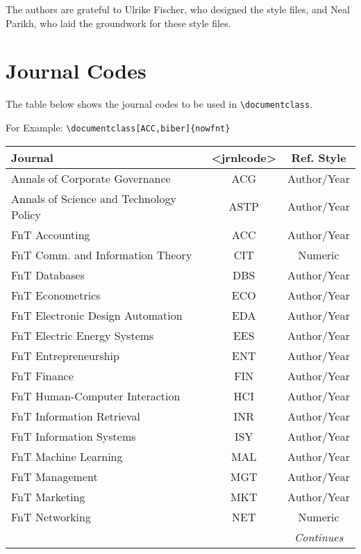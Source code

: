 \documentclass[examplefnt,biber]{nowfnt} %
\begin{document}



\begin{acknowledgements}
The authors are grateful to Ulrike Fischer, who designed the style files, and
Neal Parikh, who laid the groundwork for these style files.
\end{acknowledgements}

\appendix
\chapter{Journal Codes}\label{App:journalcodes}
\vspace*{-1.2in}
The table below shows the journal codes to be used in  \verb+\documentclass+.

\noindent For Example: \verb+\documentclass[ACC,biber]{nowfnt}+

\begin{table}[h]
\begin{tabular}{lcc}
{\textbf Journal} & {\textbf <jrnlcode> } & {\textbf Ref. Style }\\
\hline
\small
Annals of Corporate Governance & ACG & Author/Year \\
\small
Annals of Science and Technology Policy & ASTP & Author/Year \\
\small
FnT Accounting & ACC & Author/Year \\
\small
FnT Comm. and Information Theory & CIT & Numeric \\
\small
FnT Databases & DBS & Author/Year \\
\small
FnT Econometrics & ECO & Author/Year \\
\small
FnT Electronic Design Automation & EDA & Author/Year \\
\small
FnT Electric Energy Systems & EES & Author/Year \\
\small
FnT Entrepreneurship & ENT & Author/Year \\
\small
FnT Finance & FIN & Author/Year \\
\small
FnT Human-Computer Interaction & HCI & Author/Year \\
\small
FnT Information Retrieval & INR & Author/Year \\
\small
FnT Information Systems & ISY & Author/Year \\
\small
FnT Machine Learning & MAL & Author/Year \\
\small
FnT Management & MGT & Author/Year \\
\small
FnT Marketing & MKT & Author/Year \\
\small
FnT Networking & NET & Numeric \\
\small
& & \textit{Continues}
\end{tabular}
\end{table}
\end{document}
